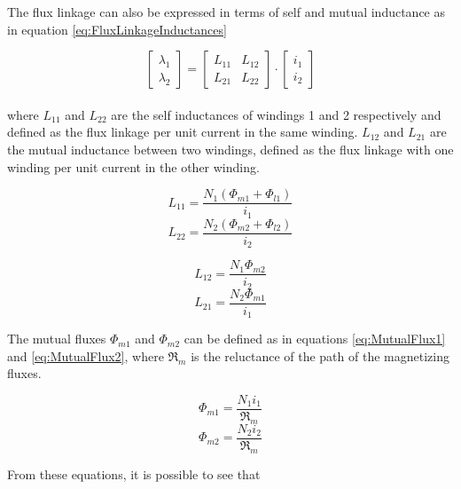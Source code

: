 The flux linkage can also be expressed in terms of self and mutual inductance as in equation \ref{eq:FluxLinkageInductances}

\begin{equation} \label{eq:FluxLinkageInductances}
	\begin{bmatrix}
		\lambda_1\\
		\lambda_2
	\end{bmatrix}
		=
	\begin{bmatrix}
		L_{11} & L_{12}\\
		L_{21} & L_{22}
	\end{bmatrix}
		\cdot
	\begin{bmatrix}
		i_1\\
		i_2		
	\end{bmatrix}
\end{equation}
\\
where $L_{11}$ and $L_{22}$ are the self inductances of windings 1 and 2 respectively and defined as the flux linkage per unit current in the same winding. $L_{12}$ and $L_{21}$ are the mutual inductance between two windings, defined as the flux linkage with one winding per unit current in the other winding.

\begin{equation}
	L_{11} = \frac{N_1(\Phi_{m1} + \Phi_{l1})}{i_1}
\end{equation}
\begin{equation}
	L_{22} =  \frac{N_2(\Phi_{m2} + \Phi_{l2})}{i_2}
\end{equation}

\begin{equation}
	L_{12} = \frac{N_1 \Phi_{m2}}{i_2}
\end{equation}
\begin{equation}
	L_{21} = \frac{N_2 \Phi_{m1}}{i_1}
\end{equation}

The mutual fluxes $\Phi_{m1}$ and $\Phi_{m2}$ can be defined as in equations \ref{eq:MutualFlux1} and \ref{eq:MutualFlux2}, where $\Re_m$ is the reluctance of the path of the magnetizing fluxes. 

\begin{equation} \label{eq:MutualFlux1}
	\Phi_{m1} = \frac{N_1 i_1}{\Re_m} 
\end{equation} 
\begin{equation} \label{eq:MutualFlux2}
	\Phi_{m2} = \frac{N_2 i_2}{\Re_m} 
\end{equation}

From these equations, it is possible to see that

